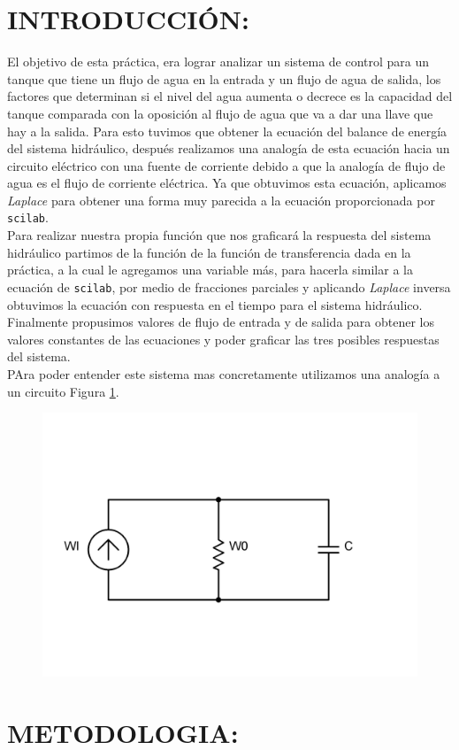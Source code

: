 \documentclass[letterpaper,10pt]{article}
\begin{document}
	\section{INTRODUCCIÓN:}
	El objetivo de esta práctica, era lograr analizar un sistema de control para un tanque que tiene un flujo de
	agua en la entrada y un flujo de agua de salida, los factores que determinan si el nivel del agua aumenta o decrece 
	es la capacidad del tanque comparada con la oposición al flujo de agua que va a dar una llave que hay a la salida.
	Para esto tuvimos que obtener la ecuación del balance de energía del sistema hidráulico, después realizamos una analogía 
	de esta ecuación hacia un circuito eléctrico con una fuente de corriente debido a que la analogía de flujo de agua
	es el flujo de corriente eléctrica. Ya que obtuvimos esta ecuación, aplicamos \textit{Laplace} para obtener una forma muy parecida
	a la ecuación proporcionada por \texttt{scilab}.\\
	
	Para realizar nuestra propia función que nos graficará la respuesta del sistema hidráulico partimos de la función de 
	la función de transferencia dada en la práctica, a la cual le agregamos una variable más, para hacerla similar a
	la ecuación de \texttt{scilab}, por medio de fracciones parciales y aplicando \textit{Laplace} inversa obtuvimos la ecuación con respuesta en 
	el tiempo para el sistema hidráulico. Finalmente propusimos valores de flujo de entrada y de salida para obtener los valores
	constantes de las ecuaciones y poder graficar las tres posibles respuestas del sistema.\\
	PAra poder entender este sistema mas concretamente utilizamos una analogía a un circuito Figura \ref{fig:circ}.
	
	\begin{figure}[h!]
		\centering
		\includegraphics[width=0.4\linewidth]{circ}
		\caption{}
		\label{fig:circ}
	\end{figure}
	\pagebreak
	\section{METODOLOGIA:}
\end{document}

